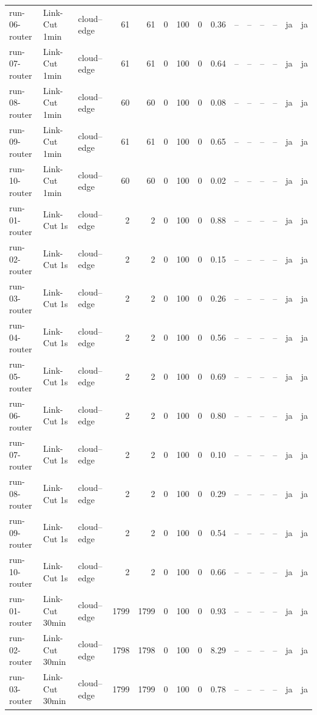 \begin{table}
{\begin{tabular}{l l p{3.2cm} r r r r r r r r r r r r}
run-06-router & Link-Cut 1min & cloud--edge & 61 & 61 & 0 & 100 & 0 & 0.36 & -- & -- & -- & -- & ja & ja \\
run-07-router & Link-Cut 1min & cloud--edge & 61 & 61 & 0 & 100 & 0 & 0.64 & -- & -- & -- & -- & ja & ja \\
run-08-router & Link-Cut 1min & cloud--edge & 60 & 60 & 0 & 100 & 0 & 0.08 & -- & -- & -- & -- & ja & ja \\
run-09-router & Link-Cut 1min & cloud--edge & 61 & 61 & 0 & 100 & 0 & 0.65 & -- & -- & -- & -- & ja & ja \\
run-10-router & Link-Cut 1min & cloud--edge & 60 & 60 & 0 & 100 & 0 & 0.02 & -- & -- & -- & -- & ja & ja \\
run-01-router & Link-Cut 1s & cloud--edge & 2 & 2 & 0 & 100 & 0 & 0.88 & -- & -- & -- & -- & ja & ja \\
run-02-router & Link-Cut 1s & cloud--edge & 2 & 2 & 0 & 100 & 0 & 0.15 & -- & -- & -- & -- & ja & ja \\
run-03-router & Link-Cut 1s & cloud--edge & 2 & 2 & 0 & 100 & 0 & 0.26 & -- & -- & -- & -- & ja & ja \\
run-04-router & Link-Cut 1s & cloud--edge & 2 & 2 & 0 & 100 & 0 & 0.56 & -- & -- & -- & -- & ja & ja \\
run-05-router & Link-Cut 1s & cloud--edge & 2 & 2 & 0 & 100 & 0 & 0.69 & -- & -- & -- & -- & ja & ja \\
run-06-router & Link-Cut 1s & cloud--edge & 2 & 2 & 0 & 100 & 0 & 0.80 & -- & -- & -- & -- & ja & ja \\
run-07-router & Link-Cut 1s & cloud--edge & 2 & 2 & 0 & 100 & 0 & 0.10 & -- & -- & -- & -- & ja & ja \\
run-08-router & Link-Cut 1s & cloud--edge & 2 & 2 & 0 & 100 & 0 & 0.29 & -- & -- & -- & -- & ja & ja \\
run-09-router & Link-Cut 1s & cloud--edge & 2 & 2 & 0 & 100 & 0 & 0.54 & -- & -- & -- & -- & ja & ja \\
run-10-router & Link-Cut 1s & cloud--edge & 2 & 2 & 0 & 100 & 0 & 0.66 & -- & -- & -- & -- & ja & ja \\
run-01-router & Link-Cut 30min & cloud--edge & 1799 & 1799 & 0 & 100 & 0 & 0.93 & -- & -- & -- & -- & ja & ja \\
run-02-router & Link-Cut 30min & cloud--edge & 1798 & 1798 & 0 & 100 & 0 & 8.29 & -- & -- & -- & -- & ja & ja \\
run-03-router & Link-Cut 30min & cloud--edge & 1799 & 1799 & 0 & 100 & 0 & 0.78 & -- & -- & -- & -- & ja & ja \\

\end{tabular}}
\end{table}
